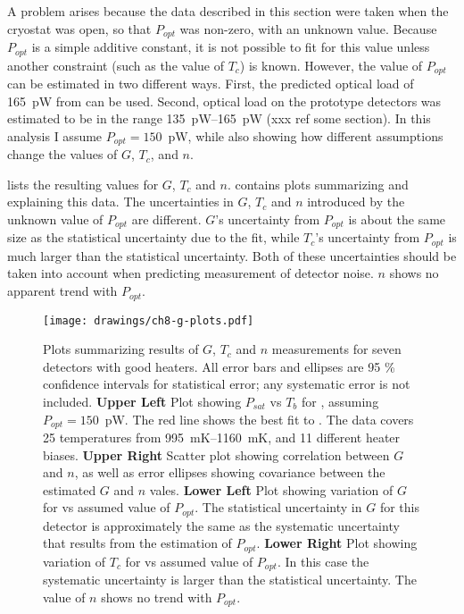 A problem arises because the data described in this section were taken when the cryostat was open, so that $P_{opt}$ was non-zero, with an unknown value.
Because $P_{opt}$ is a simple additive constant, it is not possible to fit for this value unless another constraint (such as the value of $T_c$) is known.
However, the value of $P_{opt}$ can be estimated in two different ways. 
First, the predicted optical load of 165~pW from  can be used.
Second, optical load on the prototype detectors was estimated to be in the range 135~pW--165~pW (xxx ref some section).
In this analysis I assume $P_{opt} = 150$~pW, while also showing how different assumptions change the values of  $G$, $T_c$, and $n$.

 lists the resulting values for $G$, $T_c$ and $n$.
 contains plots summarizing and explaining this data.
The uncertainties in $G$, $T_c$ and $n$ introduced by the unknown value of $P_{opt}$ are different.
$G$'s uncertainty from $P_{opt}$ is about the same size as the statistical uncertainty due to the fit, while $T_c$'s uncertainty from $P_{opt}$ is much larger than the statistical uncertainty.
Both of these uncertainties should be taken into account when predicting measurement of detector noise.
$n$ shows no apparent trend with $P_{opt}$.

\begin{figure*}
\texttt{[image: drawings/ch8-g-plots.pdf]}
\caption{Plots summarizing results of $G$, $T_c$ and $n$ measurements for seven detectors with good heaters.
All error bars and ellipses are 95 \% confidence intervals for statistical error; any systematic error is not included.
\textbf{Upper Left} Plot showing $P_{sat}$ vs $T_b$ for , assuming $P_{opt} = 150$~pW.
The red line shows the best fit to .
The data covers 25 temperatures from 995~mK--1160~mK, and 11 different heater biases.
\textbf{Upper Right} Scatter plot showing correlation between $G$ and $n$, as well as error ellipses showing covariance between the estimated $G$ and $n$ vales.
\textbf{Lower Left} Plot showing variation of $G$ for  vs assumed value of $P_{opt}$.
The statistical uncertainty in $G$ for this detector is approximately the same as the systematic uncertainty that results from the estimation of $P_{opt}$.
\textbf{Lower Right} Plot showing variation of $T_c$ for  vs assumed value of $P_{opt}$.
In this case the systematic uncertainty is larger than the statistical uncertainty.
The value of $n$ shows no trend with $P_{opt}$.
} 
\label{fig:heater-g-plots}
\end{figure*}

